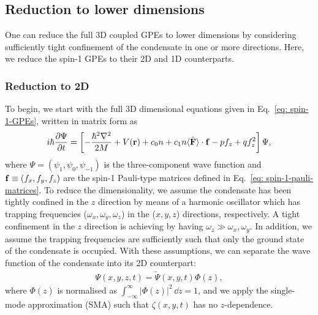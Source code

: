 \subsection{Reduction to lower dimensions}
One can reduce the full 3D coupled GPEs to lower dimensions by considering
sufficiently tight confinement of the condensate in one or more directions.
Here, we reduce the spin-1 GPEs to their 2D and 1D counterparts.

\subsubsection{Reduction to 2D}
To begin, we start with the full 3D dimensional equations given in
Eq.~\eqref{eq: spin-1-GPEs}, written in matrix form as
\begin{align}\label{eq: spin-1-GPEs-matrix}
    i\hbar \pdv{\Psi}{t} = \left[-\frac{\hbar^2\nabla^2}{2M} + V(\vb{r}) + c_0n
    + c_1n \langle\hat{\vb{F}}\rangle \cdot \vb{f}
    - pf_z
    + qf_z^2\right]\Psi,
\end{align}
where \(\Psi=(\psi_1, \psi_0, \psi_{-1})\) is the three-component wave function
and \(\vb{f}\equiv(f_x, f_y, f_z)\) are the spin-1 Pauli-type matrices defined
in Eq.~\eqref{eq: spin-1-pauli-matrices}.
To reduce the dimensionality, we assume the condensate has been tightly confined
in the \(z\) direction by means of a harmonic oscillator which has trapping
frequencies (\(\omega_x, \omega_y, \omega_z\)) in the (\(x, y, z\)) directions,
respectively.
A tight confinement in the \(z\) direction is achieving by having
\(\omega_z \gg \omega_x, \omega_y\).
In addition, we assume the trapping frequencies are sufficiently such that only
the ground state of the condensate is occupied.
With these assumptions, we can separate the wave function of the condensate into
its 2D counterpart:
\begin{align}\label{eq: Psi-2D}
    \Psi(x, y, z, t) = \tilde{\Psi}(x, y, t)\Phi(z),
\end{align}
where \(\Phi(z)\) is normalised as \(\int_{-\infty}^{\infty}|\Phi(z)|^2 \, \dd z
= 1\), and we apply the single-mode approximation (SMA) such that
\(\zeta(x, y, t)\) has no \(z\)-dependence.

